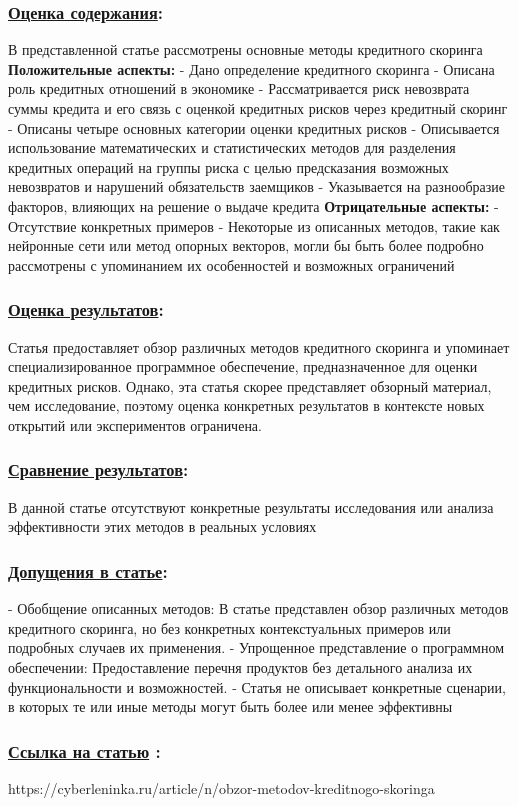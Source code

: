 \documentclass[a4paper,14pt]{article}
\begin{document}
\subsubsection*{\underline{Оценка содержания}:}
В представленной статье рассмотрены основные методы кредитного скоринга  \newline
\textbf{Положительные аспекты:} \newline
- Дано определение кредитного скоринга \newline
- Описана роль кредитных отношений в экономике \newline
- Рассматривается риск невозврата суммы кредита и его связь с оценкой кредитных рисков через кредитный скоринг \newline
- Описаны четыре основных категории оценки кредитных рисков \newline
- Описывается использование математических и статистических методов для разделения кредитных операций на группы риска с целью предсказания возможных невозвратов и нарушений обязательств заемщиков  \newline
- Указывается на разнообразие факторов, влияющих на решение о выдаче кредита \vspace{10pt} \newline
\textbf{Отрицательные аспекты:} \newline
- Отсутствие конкретных примеров  \newline
- Некоторые из описанных методов, такие как нейронные сети или метод опорных векторов, могли бы быть более подробно рассмотрены с упоминанием их особенностей и возможных ограничений

\subsubsection*{\underline{Оценка результатов}:}
Статья предоставляет обзор различных методов кредитного скоринга и упоминает специализированное программное обеспечение, предназначенное для оценки кредитных рисков. Однако, эта статья скорее представляет обзорный материал, чем исследование, поэтому оценка конкретных результатов в контексте новых открытий или экспериментов ограничена.
\subsubsection*{\underline{Сравнение результатов}:}
В данной статье отсутствуют конкретные результаты исследования или анализа эффективности этих методов в реальных условиях
\subsubsection*{\underline{Допущения в статье}:}
- Обобщение описанных методов: В статье представлен обзор различных методов кредитного скоринга, но без конкретных контекстуальных примеров или подробных случаев их применения.  \newline
- Упрощенное представление о программном обеспечении: Предоставление перечня продуктов без детального анализа их функциональности и возможностей.  \newline
- Статья не описывает конкретные сценарии, в которых те или иные методы могут быть более или менее эффективны

\subsubsection*{\underline{Ссылка на статью} :}
https://cyberleninka.ru/article/n/obzor-metodov-kreditnogo-skoringa
\end{document}
